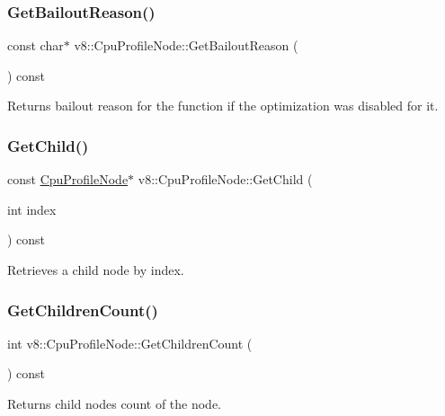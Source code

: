 \subsubsection{\texorpdfstring{Get\+Bailout\+Reason()}{GetBailoutReason()}}
{\footnotesize\ttfamily const char$\ast$ v8\+::\+Cpu\+Profile\+Node\+::\+Get\+Bailout\+Reason (\begin{DoxyParamCaption}{ }\end{DoxyParamCaption}) const}

Returns bailout reason for the function if the optimization was disabled for it. \mbox{\label{classv8_1_1CpuProfileNode_a9432760b2ab86fe7536b7f7b264ff0ae}} 
\subsubsection{\texorpdfstring{Get\+Child()}{GetChild()}}
{\footnotesize\ttfamily const \mbox{\hyperlink{classv8_1_1CpuProfileNode}{Cpu\+Profile\+Node}}$\ast$ v8\+::\+Cpu\+Profile\+Node\+::\+Get\+Child (\begin{DoxyParamCaption}\item[{int}]{index }\end{DoxyParamCaption}) const}

Retrieves a child node by index. \mbox{\label{classv8_1_1CpuProfileNode_afc0f772f6dad49b670c7b9675d27c688}} 
\subsubsection{\texorpdfstring{Get\+Children\+Count()}{GetChildrenCount()}}
{\footnotesize\ttfamily int v8\+::\+Cpu\+Profile\+Node\+::\+Get\+Children\+Count (\begin{DoxyParamCaption}{ }\end{DoxyParamCaption}) const}

Returns child nodes count of the node. \mbox{\label{classv8_1_1CpuProfileNode_a9df61090cf365f1f03d5bce44653f1f5}} 

